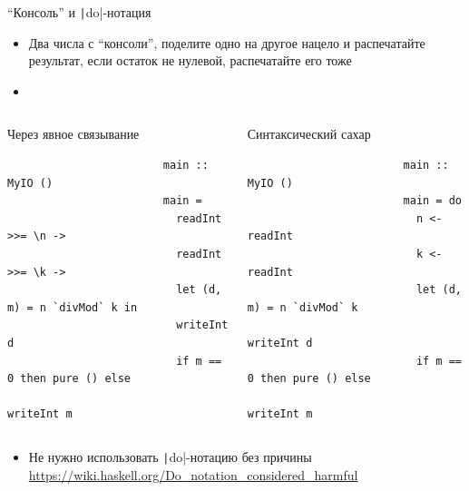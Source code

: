     \begin{frame}[fragile]{``Консоль'' и \texttt|do|-нотация}
        \begin{itemize}
            \item[\todo] Два числа с ``консоли'', поделите одно на другое нацело и распечатайте результат, если остаток не нулевой, распечатайте его тоже
            \item[\answer]
        \end{itemize}
        \vspace{-1.7em}
        \begin{columns}[onlytextwidth]
            \begin{column}[t]{0.485\textwidth}
                \pause
                \begin{block}{Через явное связывание}
                    \begin{verbatim}
                        main :: MyIO ()
                        main =
                          readInt >>= \n ->
                          readInt >>= \k ->
                          let (d, m) = n `divMod` k in
                          writeInt d
                          if m == 0 then pure () else
                            writeInt m
                    \end{verbatim}
                \end{block}
            \end{column}\hfill%
            \begin{column}[t]{0.485\textwidth}
                \pause
                \begin{block}{Синтаксический сахар}
                    \begin{verbatim}
                        main :: MyIO ()
                        main = do
                          n <- readInt
                          k <- readInt
                          let (d, m) = n `divMod` k
                          writeInt d
                          if m == 0 then pure () else
                            writeInt m
                    \end{verbatim}
                \end{block}
            \end{column}
        \end{columns}
        \vspace{0.5em}
        \begin{itemize}
            \item Не нужно использовать \texttt|do|-нотацию без причины\\ {\color{blue} \url{https://wiki.haskell.org/Do_notation_considered_harmful}}
        \end{itemize}
    \end{frame}

